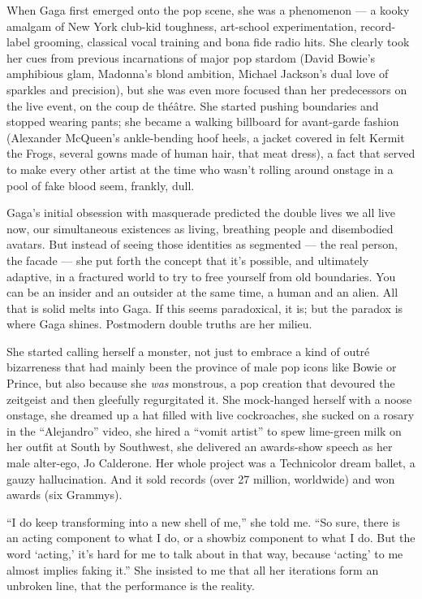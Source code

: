When Gaga first emerged onto the pop scene, she was a phenomenon --- a
kooky amalgam of New York club-kid toughness, art-school
experimentation, record-label grooming, classical vocal training and
bona fide radio hits. She clearly took her cues from previous
incarnations of major pop stardom (David Bowie's amphibious glam,
Madonna's blond ambition, Michael Jackson's dual love of sparkles and
precision), but she was even more focused than her predecessors on the
live event, on the coup de théâtre. She started pushing boundaries and
stopped wearing pants; she became a walking billboard for avant-garde
fashion (Alexander McQueen's ankle-bending hoof heels, a jacket covered
in felt Kermit the Frogs, several gowns made of human hair, that meat
dress), a fact that served to make every other artist at the time who
wasn't rolling around onstage in a pool of fake blood seem, frankly,
dull.

Gaga's initial obsession with masquerade predicted the double lives we
all live now, our simultaneous existences as living, breathing people
and disembodied avatars. But instead of seeing those identities as
segmented --- the real person, the facade --- she put forth the concept
that it's possible, and ultimately adaptive, in a fractured world to try
to free yourself from old boundaries. You can be an insider and an
outsider at the same time, a human and an alien. All that is solid melts
into Gaga. If this seems paradoxical, it is; but the paradox is where
Gaga shines. Postmodern double truths are her milieu.

She started calling herself a monster, not just to embrace a kind of
outré bizarreness that had mainly been the province of male pop icons
like Bowie or Prince, but also because she \emph{was} monstrous, a pop
creation that devoured the zeitgeist and then gleefully regurgitated it.
She mock-hanged herself with a noose onstage, she dreamed up a hat
filled with live cockroaches, she sucked on a rosary in the
``Alejandro'' video, she hired a ``vomit artist'' to spew lime-green
milk on her outfit at South by Southwest, she delivered an awards-show
speech as her male alter-ego, Jo Calderone. Her whole project was a
Technicolor dream ballet, a gauzy hallucination. And it sold records
(over 27 million, worldwide) and won awards (six Grammys).

``I do keep transforming into a new shell of me,'' she told me. ``So
sure, there is an acting component to what I do, or a showbiz component
to what I do. But the word `acting,' it's hard for me to talk about in
that way, because `acting' to me almost implies faking it.'' She
insisted to me that all her iterations form an unbroken line, that the
performance is the reality.

